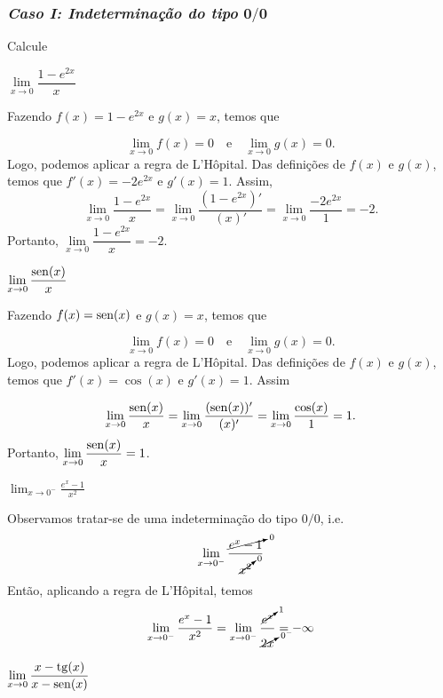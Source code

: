 \cleardoublepage\documentclass[../main.tex]{subfiles}
\begin{document}
\subsubsection*{\emph{Caso I: Indeterminação do tipo} $\mathbf{0/0}$}
\begin{exeresol}
  Calcule
  \begin{compactenum}[a)]
   \item \(\lim \limits_{x\to 0}\dfrac{1-e^{2x}}{x}\)\\
  
  \begin{resol}
  Fazendo \(f(x)=1-e^{2x}\) e \(g(x)=x\), temos que

\[ \lim \limits_{x\to 0}f(x)=0 \quad \mbox{e}\quad \lim \limits_{x\to 0}g(x)=0. \]
Logo, podemos aplicar a regra de L’Hôpital. Das definições de \(f(x)\) e \(g(x)\), temos que \(f'(x)=-2e^{2x}\) e \(g'(x)=1\). Assim,
\[ \lim \limits_{x\to 0}\dfrac{1-e^{2x}}{x}=\lim \limits_{x\to 0}\dfrac{(1-e^{2x})'}{(x)'}=\lim \limits_{x\to 0}\dfrac{-2e^{2x}}{1}=-2. \]
Portanto, \(\lim \limits_{x\to 0}\dfrac{1-e^{2x}}{x}=-2\).
  \end{resol}
  \item \(\lim \limits_{x\to 0}\dfrac{{\rm sen}(x)}{x}\)\\
  
  \begin{resol}
  Fazendo \(f(x)={\rm sen}(x)\) e \(g(x)=x\), temos que

\[ \lim \limits_{x\to 0}f(x)=0 \quad \mbox{e}\quad \lim \limits_{x\to 0}g(x)=0. \]
Logo, podemos aplicar a regra de L’Hôpital. Das definições de \(f(x)\) e \(g(x)\), temos que \(f'(x)=\cos(x)\) e \(g'(x)=1\). Assim

\[ \lim \limits_{x\to 0}\dfrac{{\rm sen}(x)}{x}=\lim \limits_{x\to 0}\dfrac{({\rm sen}(x))'}{(x)'}=\lim \limits_{x\to 0}\dfrac{\cos(x)}{1}=1. \]
Portanto, \(\lim \limits_{x\to 0}\dfrac{{\rm sen}(x)}{x}=1\).
  \end{resol}
   \item \( \lim_{x\to 0^-} \frac{e^x-1}{x^2}\)\\
  
  \begin{resol}
   Observamos tratar-se de uma indeterminação do tipo $0/0$, i.e.
  \begin{equation*}
    \lim_{x\to 0^-} \frac{\cancelto{0}{e^x-1}}{\cancelto{0}{x^2}}
  \end{equation*}
  Então, aplicando a regra de L'Hôpital, temos
  \begin{equation*}
    \lim_{x\to 0^-} \frac{e^x-1}{x^2} = \lim_{x\to 0^-} \frac{\cancelto{1}{e^x}}{\cancelto{0^-}{2x}} = -\infty
  \end{equation*}
  \end{resol}
  \item \(\lim \limits_{x\to 0}\dfrac{x-{\rm tg}(x)}{x-{\rm sen}(x)}\)\\
  

\end{compactenum}
\end{exeresol}
\end{document}

